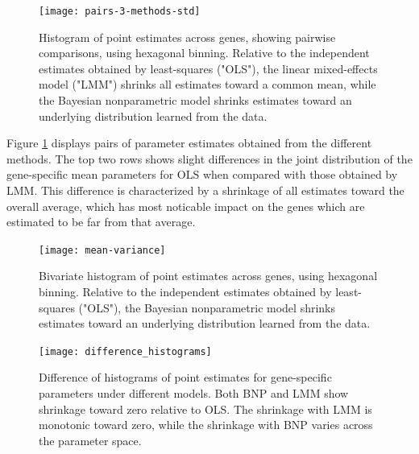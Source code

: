 {\begin{figure}[ht]
\centering
\texttt{[image: pairs-3-methods-std]}
\caption{Histogram of point estimates across genes, showing pairwise comparisons, using hexagonal binning. Relative to the independent estimates obtained by least-squares ("OLS"), the linear mixed-effects model ("LMM") shrinks all estimates toward a common mean, while the Bayesian nonparametric model shrinks estimates toward an underlying distribution learned from the data.}
\label{pairs-3-methods}
\end{figure}

Figure \ref{pairs-3-methods} displays pairs of parameter estimates obtained from the different methods. The top two rows shows slight differences in the joint distribution of the gene-specific mean parameters for OLS when compared with those obtained by LMM. This difference is characterized by a shrinkage of all estimates toward the overall average, which has most noticable impact on the genes which are estimated to be far from that average.

\begin{figure}[ht]
\centering
\texttt{[image: mean-variance]}
\caption{Bivariate histogram of point estimates across genes, using hexagonal binning. Relative to the independent estimates obtained by least-squares ("OLS"), the Bayesian nonparametric model shrinks estimates toward an underlying distribution learned from the data.}
\label{mean-variance}
\end{figure}

\begin{figure}[ht]
\centering
\texttt{[image: difference\_histograms]}
\caption{Difference of histograms of point estimates for gene-specific parameters under different models. Both BNP and LMM show shrinkage toward zero relative to OLS. The shrinkage with LMM is monotonic toward zero, while the shrinkage with BNP varies across the parameter space.}
\label{diff-hist}
\end{figure}


}
